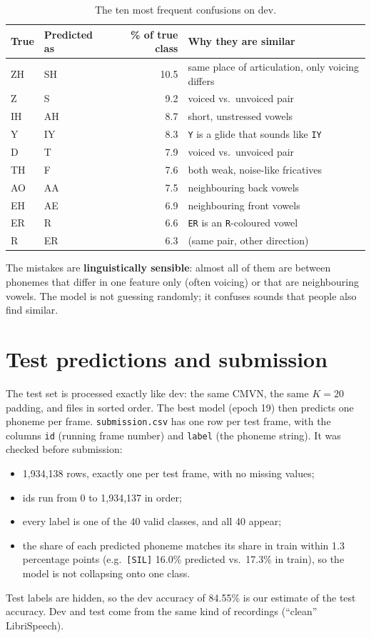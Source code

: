 \documentclass[11pt,a4paper]{article}
\begin{document}
\begin{table}[H]
\centering
\small
\begin{tabular}{llrl}
\toprule
True & Predicted as & \% of true class & Why they are similar \\
\midrule
ZH & SH & 10.5 & same place of articulation, only voicing differs \\
Z  & S  &  9.2 & voiced vs.\ unvoiced pair \\
IH & AH &  8.7 & short, unstressed vowels \\
Y  & IY &  8.3 & \texttt{Y} is a glide that sounds like \texttt{IY} \\
D  & T  &  7.9 & voiced vs.\ unvoiced pair \\
TH & F  &  7.6 & both weak, noise-like fricatives \\
AO & AA &  7.5 & neighbouring back vowels \\
EH & AE &  6.9 & neighbouring front vowels \\
ER & R  &  6.6 & \texttt{ER} is an \texttt{R}-coloured vowel \\
R  & ER &  6.3 & (same pair, other direction) \\
\bottomrule
\end{tabular}
\caption{The ten most frequent confusions on dev.}
\end{table}

The mistakes are \textbf{linguistically sensible}: almost all of them are between phonemes that differ in
one feature only (often voicing) or that are neighbouring vowels. The model is not guessing randomly;
it confuses sounds that people also find similar.

\section{Test predictions and submission}
The test set is processed exactly like dev: the same CMVN, the same $K=20$ padding, and files in sorted
order. The best model (epoch 19) then predicts one phoneme per frame. \texttt{submission.csv} has one row
per test frame, with the columns \texttt{id} (running frame number) and \texttt{label} (the phoneme
string). It was checked before submission:
\begin{itemize}\itemsep0pt
  \item 1,934,138 rows, exactly one per test frame, with no missing values;
  \item ids run from 0 to 1,934,137 in order;
  \item every label is one of the 40 valid classes, and all 40 appear;
  \item the share of each predicted phoneme matches its share in train within 1.3 percentage points
        (e.g.\ \texttt{[SIL]} 16.0\% predicted vs.\ 17.3\% in train), so the model is not collapsing
        onto one class.
\end{itemize}
Test labels are hidden, so the dev accuracy of 84.55\% is our estimate of the test accuracy. Dev and
test come from the same kind of recordings (``clean'' LibriSpeech).
\end{document}
